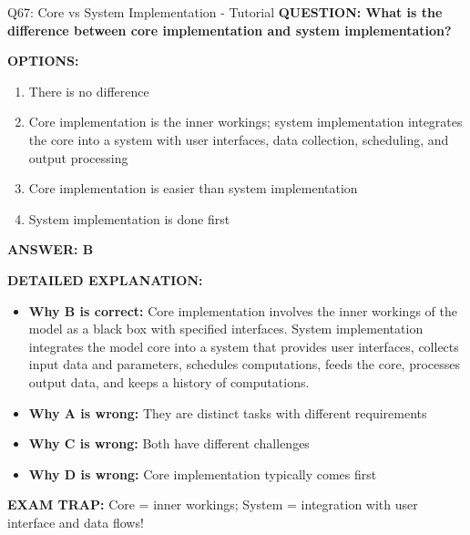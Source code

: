 \documentclass[8pt]{beamer}
\begin{document}
	\begin{frame}{Q67: Core vs System Implementation - Tutorial}
		\fontsize{6.5}{7.5}\selectfont
		\textbf{QUESTION: What is the difference between core implementation and system implementation?}
		
		\vspace{0.1cm}
		\textbf{OPTIONS:}
		\begin{enumerate}
			\item There is no difference
			\item Core implementation is the inner workings; system implementation integrates the core into a system with user interfaces, data collection, scheduling, and output processing
			\item Core implementation is easier than system implementation
			\item System implementation is done first
		\end{enumerate}
		
		\vspace{0.1cm}
		\textcolor{myblue}{\textbf{ANSWER: B}}
		
		\vspace{0.1cm}
		\textbf{DETAILED EXPLANATION:}
		\begin{itemize}
			\item \textbf{Why B is correct:} Core implementation involves the inner workings of the model as a black box with specified interfaces. System implementation integrates the model core into a system that provides user interfaces, collects input data and parameters, schedules computations, feeds the core, processes output data, and keeps a history of computations.
			\item \textbf{Why A is wrong:} They are distinct tasks with different requirements
			\item \textbf{Why C is wrong:} Both have different challenges
			\item \textbf{Why D is wrong:} Core implementation typically comes first
		\end{itemize}
		
		\textcolor{myred}{\textbf{EXAM TRAP:}} Core = \textcolor{myblue}{inner workings}; System = \textcolor{myblue}{integration with user interface and data flows}!
	\end{frame}
	
\end{document}
